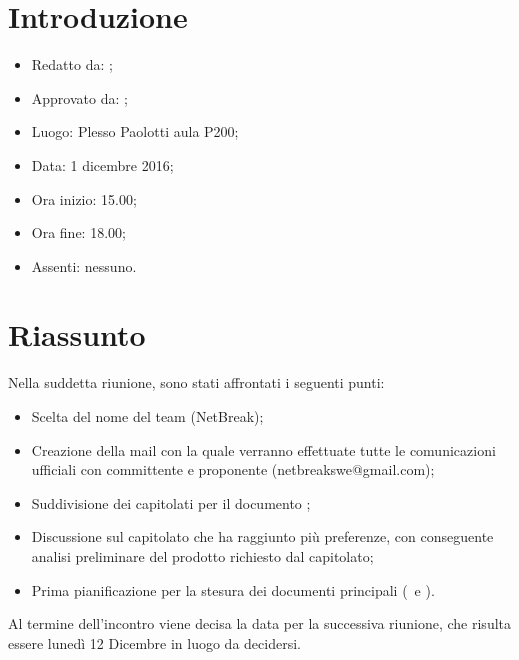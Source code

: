 \section{Introduzione}

	\begin{itemize}
		\item Redatto da: \DS;
		\item Approvato da: \AS;
		\item Luogo: Plesso Paolotti aula P200;
		\item Data: 1 dicembre 2016;
		\item Ora inizio: 15.00;
		\item Ora fine: 18.00;
		\item Assenti: nessuno.	
	\end{itemize}

\section{Riassunto}
Nella suddetta riunione, sono stati affrontati i seguenti punti:
\begin{itemize}
	\item Scelta del nome del team (NetBreak);
	\item Creazione della mail con la quale verranno effettuate tutte le comunicazioni ufficiali con committente e proponente (netbreakswe@gmail.com);
	\item Suddivisione dei capitolati per il documento \SdF;
	\item Discussione sul capitolato che ha raggiunto più preferenze, con conseguente analisi preliminare del prodotto richiesto dal capitolato;
	\item Prima pianificazione per la stesura dei documenti principali (\NdP\ e \AdR).
\end{itemize}
Al termine dell'incontro viene decisa la data per la successiva riunione, che risulta essere lunedì 12 Dicembre in luogo da decidersi.